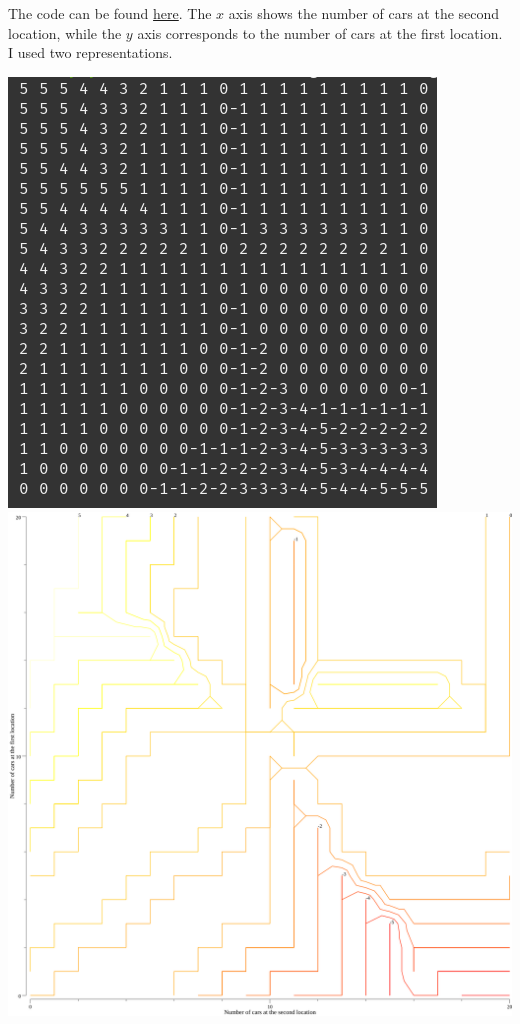 \documentclass[12pt,a4paper]{article}
\begin{document}
\begin{enumerate}
    The code can be found \href{https://github.com/hannagabor/SBRL/blob/master/4.7/main.go}{here}.
    The $x$ axis shows the number of cars at the second location, while the $y$ axis corresponds
    to the number of cars at the first location. I used two representations.
    \begin{center}
      \includegraphics{printed_pi}
      \includegraphics[scale=0.3]{pi}
    \end{center}

\end{enumerate}
\end{document}
